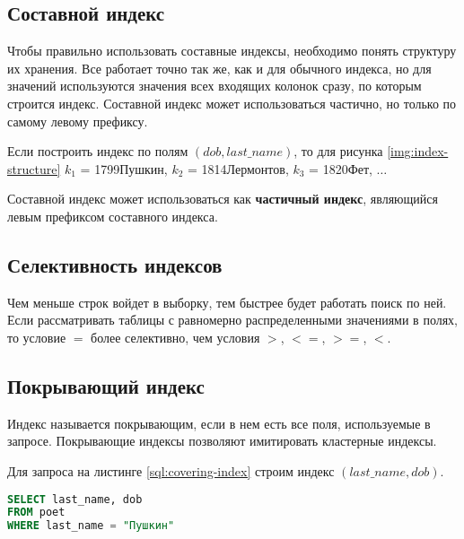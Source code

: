 \subsection{Составной индекс}

Чтобы правильно использовать составные индексы, необходимо понять структуру их хранения. Все работает точно так же, как и для обычного индекса, но для значений используются значения всех входящих колонок сразу, по которым строится индекс. Составной индекс может использоваться частично, но только по самому левому префиксу.

Если построить индекс по полям $(dob, last\_name)$, то для рисунка \ref{img:index-structure}
$k_1$ = 1799Пушкин, $k_2$ = 1814Лермонтов, $k_3$ = 1820Фет, $\ldots$

Составной индекс может использоваться как \textbf{частичный индекс}, являющийся левым префиксом составного индекса. 

\subsection{Селективность индексов}

Чем меньше строк войдет в выборку, тем быстрее будет работать поиск по ней. Если рассматривать таблицы с равномерно распределенными значениями в полях, то условие $=$ более селективно, чем условия $>$, $<=$, $>=$, $<$.

\subsection{Покрывающий индекс}
\label{section:covering-index}

Индекс называется покрывающим, если в нем есть все поля, используемые в запросе. Покрывающие индексы позволяют имитировать кластерные индексы. 

Для запроса на листинге \ref{sql:covering-index} строим индекс $(last\_name, dob)$.
\begin{lstlisting}[language=sql, label=sql:covering-index, caption={запрос для covering-index}]
SELECT last_name, dob
FROM poet
WHERE last_name = "Пушкин"
\end{lstlisting}

